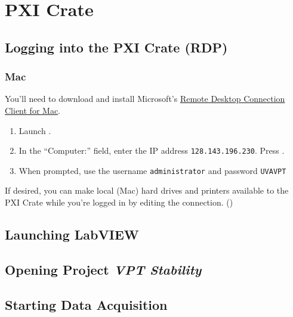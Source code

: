\chapter{PXI Crate}
\label{sec:op_pxi}

\section{Logging into the PXI Crate (RDP)}
\label{sec:op_pxi:rdp}

\subsection{Mac}
\label{sec:op_pxi:rdp:mac}

You'll need to download and install Microsoft's \href{http://www.microsoft.com/mac/products/remote-desktop/default.mspx}{Remote Desktop Connection Client for Mac}.

\begin{enumerate}
\item Launch .
\item In the ``Computer:'' field, enter the IP address \texttt{128.143.196.230}.  Press .
\item When prompted, use the username \texttt{administrator} and password \texttt{UVAVPT}
\end{enumerate}

If desired, you can make local (Mac) hard drives and printers available to the PXI Crate while you're logged in by editing the connection. ()

\section{Launching LabVIEW}
\label{sec:op_pxi:labview_launch}

\section{Opening Project \textit{VPT Stability}}
\label{sec:op_pxi:project_vptstability}

\section{Starting Data Acquisition}
\label{sec:op_pxi:daq_start}

